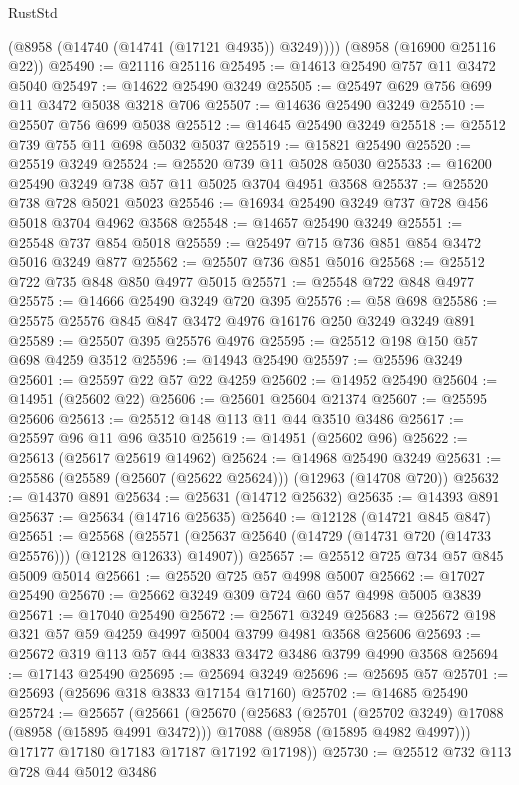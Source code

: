 \begin{lexlean}{RustStd}
\begin{coremodule}
        (@8958 (@14740 (@14741 (@17121 @4935)) @3249))))
    (@8958 (@16900 @25116 @22))
@25490 := @21116 @25116
@25495 := @14613 @25490 @757 @11 @3472 @5040
@25497 := @14622 @25490 @3249
@25505 := @25497 @629 @756 @699 @11 @3472 @5038 @3218 @706
@25507 := @14636 @25490 @3249
@25510 := @25507 @756 @699 @5038
@25512 := @14645 @25490 @3249
@25518 := @25512 @739 @755 @11 @698 @5032 @5037
@25519 := @15821 @25490
@25520 := @25519 @3249
@25524 := @25520 @739 @11 @5028 @5030
@25533 := @16200 @25490 @3249 @738 @57 @11 @5025 @3704 @4951 @3568
@25537 := @25520 @738 @728 @5021 @5023
@25546 := @16934 @25490 @3249 @737 @728 @456 @5018 @3704 @4962 @3568
@25548 := @14657 @25490 @3249
@25551 := @25548 @737 @854 @5018
@25559 := @25497 @715 @736 @851 @854 @3472 @5016 @3249 @877
@25562 := @25507 @736 @851 @5016
@25568 := @25512 @722 @735 @848 @850 @4977 @5015
@25571 := @25548 @722 @848 @4977
@25575 := @14666 @25490 @3249 @720 @395
@25576 := @58 @698
@25586 := @25575 @25576 @845 @847 @3472 @4976 @16176 @250 @3249 @3249 @891
@25589 := @25507 @395 @25576 @4976
@25595 := @25512 @198 @150 @57 @698 @4259 @3512
@25596 := @14943 @25490
@25597 := @25596 @3249
@25601 := @25597 @22 @57 @22 @4259
@25602 := @14952 @25490
@25604 := @14951 (@25602 @22)
@25606 := @25601 @25604 @21374
@25607 := @25595 @25606
@25613 := @25512 @148 @113 @11 @44 @3510 @3486
@25617 := @25597 @96 @11 @96 @3510
@25619 := @14951 (@25602 @96)
@25622 := @25613 (@25617 @25619 @14962)
@25624 := @14968 @25490 @3249
@25631 := @25586 (@25589 (@25607 (@25622 @25624))) (@12963 (@14708 @720))
@25632 := @14370 @891
@25634 := @25631 (@14712 @25632)
@25635 := @14393 @891
@25637 := @25634 (@14716 @25635)
@25640 := @12128 (@14721 @845 @847)
@25651 := @25568
    (@25571 (@25637 @25640 (@14729 (@14731 @720 (@14733 @25576))) (@12128 @12633) @14907))
@25657 := @25512 @725 @734 @57 @845 @5009 @5014
@25661 := @25520 @725 @57 @4998 @5007
@25662 := @17027 @25490
@25670 := @25662 @3249 @309 @724 @60 @57 @4998 @5005 @3839
@25671 := @17040 @25490
@25672 := @25671 @3249
@25683 := @25672 @198 @321 @57 @59 @4259 @4997 @5004 @3799 @4981 @3568 @25606
@25693 := @25672 @319 @113 @57 @44 @3833 @3472 @3486 @3799 @4990 @3568
@25694 := @17143 @25490
@25695 := @25694 @3249
@25696 := @25695 @57
@25701 := @25693 (@25696 @318 @3833 @17154 @17160)
@25702 := @14685 @25490
@25724 := @25657
    (@25661
      (@25670
        (@25683
          (@25701 (@25702 @3249) @17088 (@8958 (@15895 @4991 @3472)))
          @17088
          (@8958 (@15895 @4982 @4997)))
        @17177
        @17180
        @17183
        @17187
        @17192
        @17198))
@25730 := @25512 @732 @113 @728 @44 @5012 @3486

\end{coremodule}
\end{lexlean}
